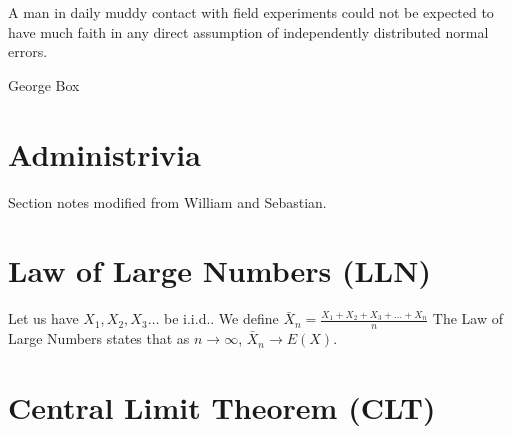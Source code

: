 \documentclass[11pt]{article}
\begin{document}


\setlength{\epigraphwidth}{.6\textwidth}
\epigraph{A man in daily muddy contact with field experiments could not be expected to have much faith in any direct assumption of independently distributed normal errors.}{George Box}

\section*{Administrivia}
Section notes modified from William and Sebastian.

\section*{Law of Large Numbers (LLN)}
Let us have $X_1, X_2, X_3 \dots$ be i.i.d.. We define $\bar{X}_n = \frac{X_1 + X_2 + X_3 + \dots + X_n}{n}$ The Law of Large Numbers states that as $n \longrightarrow \infty$, $\bar{X}_n \longrightarrow E(X)$.

\section*{Central Limit Theorem (CLT)}
\end{document}
